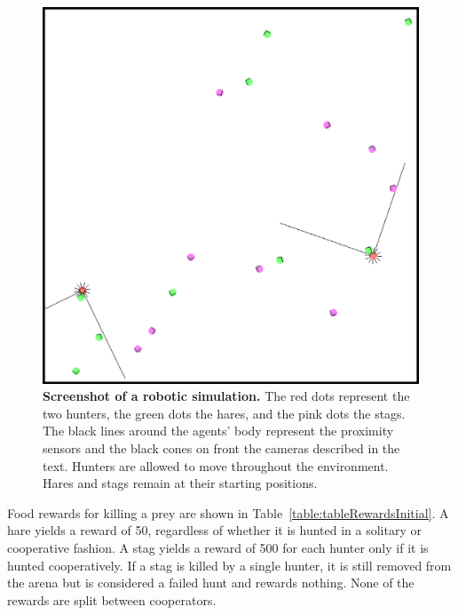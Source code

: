       \begin{figure}[hbtp]
        \centering
          \includegraphics[scale = 0.25]{fig/ArticleBio1/Fig1.eps}
        \caption{\textbf{Screenshot of a robotic simulation.} 
        The red dots represent the two hunters, the green dots the hares, and the pink dots the stags. The black lines around the agents' body represent the proximity sensors and the black cones on front the cameras described in the text. Hunters are allowed to move throughout the environment. Hares and stags remain at their starting positions.}
        \label{fig:figureSimulation}
      \end{figure}

      Food rewards for killing a prey are shown in Table~\ref{table:tableRewardsInitial}. A hare yields a reward of 50, regardless of whether it is hunted in a solitary or cooperative fashion. A stag yields a reward of 500 for each hunter only if it is hunted cooperatively. If a stag is killed by a single hunter, it is still removed from the arena but is considered a failed hunt and rewards nothing. None of the rewards are split between cooperators.

